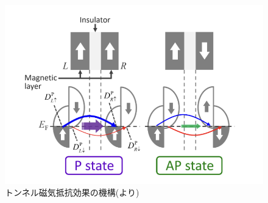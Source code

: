 \begin{figure}
    \centering
    \includegraphics[width=0.6\linewidth]{src/figures/tmr-dos/tmr-dos.png}
    \caption{トンネル磁気抵抗効果の機構(\cite{kaiju}より)}\label{fig:tmr-dos}
\end{figure}
